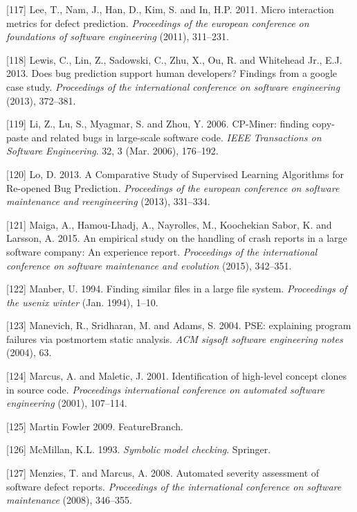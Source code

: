 \documentclass[12pt]{report}
\begin{document}
\hypertarget{ref-Lee2011a}{}
{[}117{]} Lee, T., Nam, J., Han, D., Kim, S. and In, H.P. 2011. Micro
interaction metrics for defect prediction. \emph{Proceedings of the
european conference on foundations of software engineering} (2011),
311--231.

\hypertarget{ref-Lewis2013}{}
{[}118{]} Lewis, C., Lin, Z., Sadowski, C., Zhu, X., Ou, R. and
Whitehead Jr., E.J. 2013. Does bug prediction support human developers?
Findings from a google case study. \emph{Proceedings of the
international conference on software engineering} (2013), 372--381.

\hypertarget{ref-Li2006}{}
{[}119{]} Li, Z., Lu, S., Myagmar, S. and Zhou, Y. 2006. CP-Miner:
finding copy-paste and related bugs in large-scale software code.
\emph{IEEE Transactions on Software Engineering}. 32, 3 (Mar. 2006),
176--192.

\hypertarget{ref-Lo2013}{}
{[}120{]} Lo, D. 2013. A Comparative Study of Supervised Learning
Algorithms for Re-opened Bug Prediction. \emph{Proceedings of the
european conference on software maintenance and reengineering} (2013),
331--334.

\hypertarget{ref-Maiga2015}{}
{[}121{]} Maiga, A., Hamou-Lhadj, A., Nayrolles, M., Koochekian Sabor,
K. and Larsson, A. 2015. An empirical study on the handling of crash
reports in a large software company: An experience report.
\emph{Proceedings of the international conference on software
maintenance and evolution} (2015), 342--351.

\hypertarget{ref-Manber1994}{}
{[}122{]} Manber, U. 1994. Finding similar files in a large file system.
\emph{Proceedings of the usenix winter} (Jan. 1994), 1--10.

\hypertarget{ref-Manevich2004}{}
{[}123{]} Manevich, R., Sridharan, M. and Adams, S. 2004. PSE:
explaining program failures via postmortem static analysis. \emph{ACM
sigsoft software engineering notes} (2004), 63.

\hypertarget{ref-Marcus}{}
{[}124{]} Marcus, A. and Maletic, J. 2001. Identification of high-level
concept clones in source code. \emph{Proceedings international
conference on automated software engineering} (2001), 107--114.

\hypertarget{ref-MartinFowler2009}{}
{[}125{]} Martin Fowler 2009. FeatureBranch.

\hypertarget{ref-mcmillan1993symbolic}{}
{[}126{]} McMillan, K.L. 1993. \emph{Symbolic model checking}. Springer.

\hypertarget{ref-Menzies2008}{}
{[}127{]} Menzies, T. and Marcus, A. 2008. Automated severity assessment
of software defect reports. \emph{Proceedings of the international
conference on software maintenance} (2008), 346--355.
\end{document}
